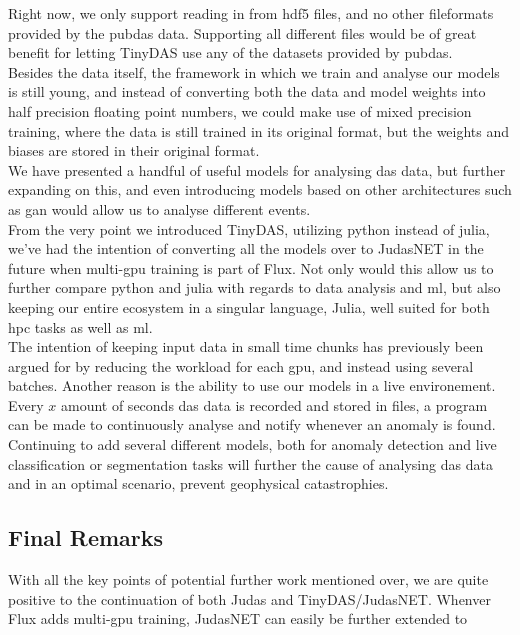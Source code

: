 Right now, we only support reading in from \acrshort{hdf5} files, and no other fileformats provided by the \Gls{pubdas} data. Supporting all different files would be of great benefit for letting TinyDAS use any of the datasets provided by \acrshort{pubdas}. \\

Besides the data itself, the framework in which we train and analyse our models is still young, and instead of converting both the data and model weights into half precision floating point numbers, we could make use of mixed precision training, where the data is still trained in its original format, but the weights and biases are stored in their original format. \\

We have presented a handful of useful models for analysing \acrshort{das} data, but further expanding on this, and even introducing models based on other architectures such as \acrshort{gan} would allow us to analyse different events. \\

From the very point we introduced TinyDAS, utilizing \Gls{python} instead of \Gls{julia}, we've had the intention of converting all the models over to JudasNET in the future when multi-gpu training is part of Flux. Not only would this allow us to further compare python and julia with regards to data analysis and \acrshort{ml}, but also keeping our entire ecosystem in a singular language, Julia, well suited for both \acrshort{hpc} tasks as well as \acrshort{ml}. \\

The intention of keeping input data in small time chunks has previously been  argued for by reducing the workload for each \acrshort{gpu}, and instead using several batches. Another reason is the ability to use our models in a live environement. Every $x$ amount of seconds \acrshort{das} data is recorded and stored in files, a program can be made to continuously analyse and notify whenever an anomaly is found. \\

Continuing to add several different models, both for anomaly detection and live classification or segmentation tasks will further the cause of analysing \acrshort{das} data and in an optimal scenario, prevent geophysical catastrophies.

\subsection{Final Remarks}

With all the key points of potential further work mentioned over, we are quite positive to the continuation of both Judas and TinyDAS/JudasNET. Whenver Flux adds multi-gpu training, JudasNET can easily be further extended to 